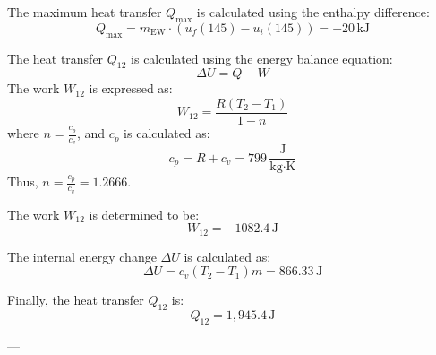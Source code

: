 The maximum heat transfer \( Q_{\text{max}} \) is calculated using the enthalpy difference:  
\[
Q_{\text{max}} = m_{\text{EW}} \cdot (u_f(145) - u_i(145)) = -20 \, \text{kJ}
\]

The heat transfer \( Q_{12} \) is calculated using the energy balance equation:  
\[
\Delta U = Q - W
\]  
The work \( W_{12} \) is expressed as:  
\[
W_{12} = \frac{R(T_2 - T_1)}{1 - n}
\]  
where \( n = \frac{c_p}{c_v} \), and \( c_p \) is calculated as:  
\[
c_p = R + c_v = 799 \, \frac{\text{J}}{\text{kg·K}}
\]  
Thus, \( n = \frac{c_p}{c_v} = 1.2666 \).  

The work \( W_{12} \) is determined to be:  
\[
W_{12} = -1082.4 \, \text{J}
\]  

The internal energy change \( \Delta U \) is calculated as:  
\[
\Delta U = c_v (T_2 - T_1) m = 866.33 \, \text{J}
\]  

Finally, the heat transfer \( Q_{12} \) is:  
\[
Q_{12} = 1,945.4 \, \text{J}
\]  

---